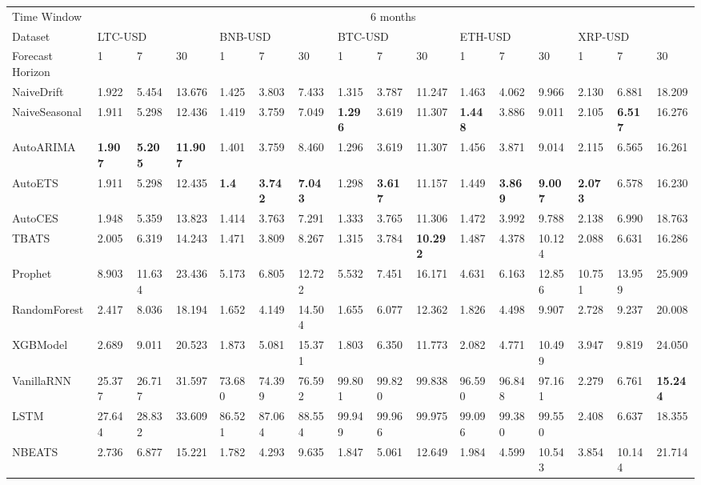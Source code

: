 \begin{tabular}{llllllllllllllll}
\toprule
Time Window & \multicolumn{15}{c}{6 months} \\
Dataset & \multicolumn{3}{l}{LTC-USD} & \multicolumn{3}{l}{BNB-USD} & \multicolumn{3}{l}{BTC-USD} & \multicolumn{3}{l}{ETH-USD} & \multicolumn{3}{l}{XRP-USD} \\
Forecast Horizon & 1 & 7 & 30 & 1 & 7 & 30 & 1 & 7 & 30 & 1 & 7 & 30 & 1 & 7 & 30 \\
\midrule
NaiveDrift & 1.922 & 5.454 & 13.676 & 1.425 & 3.803 & 7.433 & 1.315 & 3.787 & 11.247 & 1.463 & 4.062 & 9.966 & 2.130 & 6.881 & 18.209 \\
NaiveSeasonal & 1.911 & 5.298 & 12.436 & 1.419 & 3.759 & 7.049 & \textbf{1.296} & 3.619 & 11.307 & \textbf{1.448} & 3.886 & 9.011 & 2.105 & \textbf{6.517} & 16.276 \\
AutoARIMA & \textbf{1.907} & \textbf{5.205} & \textbf{11.907} & 1.401 & 3.759 & 8.460 & 1.296 & 3.619 & 11.307 & 1.456 & 3.871 & 9.014 & 2.115 & 6.565 & 16.261 \\
AutoETS & 1.911 & 5.298 & 12.435 & \textbf{1.4} & \textbf{3.742} & \textbf{7.043} & 1.298 & \textbf{3.617} & 11.157 & 1.449 & \textbf{3.869} & \textbf{9.007} & \textbf{2.073} & 6.578 & 16.230 \\
AutoCES & 1.948 & 5.359 & 13.823 & 1.414 & 3.763 & 7.291 & 1.333 & 3.765 & 11.306 & 1.472 & 3.992 & 9.788 & 2.138 & 6.990 & 18.763 \\
TBATS & 2.005 & 6.319 & 14.243 & 1.471 & 3.809 & 8.267 & 1.315 & 3.784 & \textbf{10.292} & 1.487 & 4.378 & 10.124 & 2.088 & 6.631 & 16.286 \\
Prophet & 8.903 & 11.634 & 23.436 & 5.173 & 6.805 & 12.722 & 5.532 & 7.451 & 16.171 & 4.631 & 6.163 & 12.856 & 10.751 & 13.959 & 25.909 \\
RandomForest & 2.417 & 8.036 & 18.194 & 1.652 & 4.149 & 14.504 & 1.655 & 6.077 & 12.362 & 1.826 & 4.498 & 9.907 & 2.728 & 9.237 & 20.008 \\
XGBModel & 2.689 & 9.011 & 20.523 & 1.873 & 5.081 & 15.371 & 1.803 & 6.350 & 11.773 & 2.082 & 4.771 & 10.499 & 3.947 & 9.819 & 24.050 \\
VanillaRNN & 25.377 & 26.717 & 31.597 & 73.680 & 74.399 & 76.592 & 99.801 & 99.820 & 99.838 & 96.590 & 96.848 & 97.161 & 2.279 & 6.761 & \textbf{15.244} \\
LSTM & 27.644 & 28.832 & 33.609 & 86.521 & 87.064 & 88.554 & 99.949 & 99.966 & 99.975 & 99.096 & 99.380 & 99.550 & 2.408 & 6.637 & 18.355 \\
NBEATS & 2.736 & 6.877 & 15.221 & 1.782 & 4.293 & 9.635 & 1.847 & 5.061 & 12.649 & 1.984 & 4.599 & 10.543 & 3.854 & 10.144 & 21.714 \\
\bottomrule
\end{tabular}
